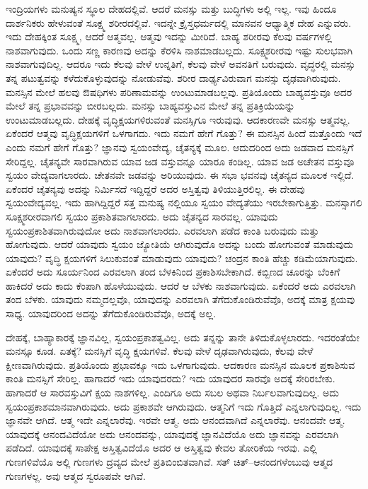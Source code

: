 ಇಂದ್ರಿಯಗಳು ಮನುಷ್ಯನ ಸ್ಥೂಲ ದೇಹದಲ್ಲಿವೆ. ಆದರೆ ಮನಸ್ಸು ಮತ್ತು ಬುದ್ಧಿಗಳು ಅಲ್ಲಿ ಇಲ್ಲ. ಇವು ಹಿಂದೂ ದಾರ್ಶನಿಕರು ಹೇಳುವಂತೆ ಸೂಕ್ಷ್ಮ ಶರೀರದಲ್ಲಿವೆ. ಇದನ್ನೇ ಕ್ರೈಸ್ತಧರ್ಮದಲ್ಲಿ ಮಾನವನ ಆಧ್ಯಾತ್ಮಿಕ ದೇಹ ಎನ್ನುವರು. ಇದು ದೇಹಕ್ಕಿಂತ ಸೂಕ್ಷ್ಮ, ಆದರೆ ಆತ್ಮವಲ್ಲ. ಆತ್ಮವು ಇದನ್ನು ಮೀರಿದೆ. ಬಾಹ್ಯ ಶರೀರವು ಕೆಲವು ವರ್ಷಗಳಲ್ಲಿ ನಾಶವಾಗುವುದು. ಒಂದು ಸಣ್ಣ ಕಾರಣವು ಅದನ್ನು ಕೆರಳಿಸಿ ನಾಶಮಾಡಬಲ್ಲದು. ಸೂಕ್ಷ್ಮಶರೀರವು ಇಷ್ಟು ಸುಲಭವಾಗಿ ನಾಶವಾಗುವುದಿಲ್ಲ. ಆದರೂ ಇದು ಕೆಲವು ವೇಳೆ ಉನ್ನತಿಗೆ, ಕೆಲವು ವೇಳೆ ಅವನತಿಗೆ ಬರುವುದು. ವೃದ್ಧರಲ್ಲಿ ಮನಸ್ಸು ತನ್ನ ಪಟುತ್ವವನ್ನು ಕಳೆದುಕೊಳ್ಳುವುದನ್ನು ನೋಡುವೆವು. ಶರೀರ ದಾರ್ಢ್ಯವಿರುವಾಗ ಮನಸ್ಸು ದೃಢವಾಗಿರುವುದು. ಮನಸ್ಸಿನ ಮೇಲೆ ಹಲವು ಔಷಧಿಗಳು ಪರಿಣಾಮವನ್ನು ಉಂಟುಮಾಡಬಲ್ಲವು. ಪ್ರತಿಯೊಂದು ಬಾಹ್ಯವಸ್ತುವೂ ಅದರ ಮೇಲೆ ತನ್ನ ಪ್ರಭಾವವನ್ನು ಬೀರಬಲ್ಲದು. ಮನಸ್ಸು ಬಾಹ್ಯವಸ್ತುವಿನ ಮೇಲೆ ತನ್ನ ಪ್ರತಿಕ್ರಿಯೆಯನ್ನು ಉಂಟುಮಾಡಬಲ್ಲದು. ದೇಹಕ್ಕೆ ವೃದ್ಧಿಕ್ಷಯಗಳಿರುವಂತೆ ಮನಸ್ಸಿಗೂ ಇರುವುವು. ಆದಕಾರಣವೇ ಮನಸ್ಸು ಆತ್ಮವಲ್ಲ. ಏಕೆಂದರೆ ಆತ್ಮವು ವೃದ್ಧಿಕ್ಷಯಗಳಿಗೆ ಒಳಗಾಗದು. ಇದು ನಮಗೆ ಹೇಗೆ ಗೊತ್ತು? ಈ ಮನಸ್ಸಿನ ಹಿಂದೆ ಮತ್ತೊಂದು ಇದೆ ಎಂದು ನಮಗೆ ಹೇಗೆ ಗೊತ್ತು? ಜ್ಞಾನವು ಸ್ವಯಂವೇದ್ಯ, ಚೈತನ್ಯಕ್ಕೆ ಮೂಲ. ಆದುದರಿಂದ ಅದು ಜಡವಾದ ಮನಸ್ಸಿಗೆ ಸೇರಿದ್ದಲ್ಲ. ಚೈತನ್ಯವೇ ಸಾರವಾಗಿರುವ ಯಾವ ಜಡ ವಸ್ತುವನ್ನೂ ಯಾರೂ ಕಂಡಿಲ್ಲ. ಯಾವ ಜಡ ಅಚೇತನ ವಸ್ತುವೂ ಸ್ವಯಂ ವೇದ್ಯವಾಗಲಾರದು. ಚೇತನವೇ ಜಡವನ್ನು ಅರಿಯುವುದು. ಈ ಸಭಾ ಭವನವು ಚೈತನ್ಯದ ಮೂಲಕ ಇಲ್ಲಿದೆ. ಏಕೆಂದರೆ ಚೈತನ್ಯವು ಅದನ್ನು ನಿರ್ಮಿಸದೆ ಇದ್ದಿದ್ದರೆ ಅದರ ಅಸ್ತಿತ್ವವು ತಿಳಿಯುತ್ತಿರಲಿಲ್ಲ. ಈ ದೇಹವು ಸ್ವಯಂವೇದ್ಯವಲ್ಲ. ಇದು ಹಾಗಿದ್ದಿದ್ದರೆ ಸತ್ತ ಮನುಷ್ಯ ನಲ್ಲಿಯೂ ಸ್ವಯಂ ವೇದ್ಯತೆಯು ಇರಬೇಕಾಗುತ್ತಿತ್ತು. ಮನಸ್ಸಾಗಲಿ ಸೂಕ್ಷ್ಮಶರೀರವಾಗಲಿ ಸ್ವಯಂ ಪ್ರಕಾಶಿತವಾಗಲಾರದು. ಅದು ಚೈತನ್ಯದ ಸಾರವಲ್ಲ. ಯಾವುದು ಸ್ವಯಂಪ್ರಕಾಶಿತವಾಗಿರುವುದೋ ಅದು ನಾಶವಾಗಲಾರದು. ಎರವಲಾಗಿ ಪಡೆದ ಕಾಂತಿ ಬರುವುದು ಮತ್ತು ಹೋಗುವುದು. ಆದರೆ ಯಾವುದು ಸ್ವಯಂ ಜ್ಯೋತಿಯೆ ಆಗಿರುವುದೊ ಅದನ್ನು ಬಂದು ಹೋಗುವಂತೆ ಮಾಡುವುದು ಯಾವುದು? ವೃದ್ಧಿ ಕ್ಷಯಗಳಿಗೆ ಸಿಲುಕುವಂತೆ ಮಾಡುವುದು ಯಾವುದು? ಚಂದ್ರನ ಕಾಂತಿ ಹೆಚ್ಚು ಕಡಿಮೆಯಾಗುವುದು. ಏಕೆಂದರೆ ಅದು ಸೂರ್ಯನಿಂದ ಎರವಲಾಗಿ ತಂದ ಬೆಳಕಿನಿಂದ ಪ್ರಕಾಶಿಸಬೇಕಾಗಿದೆ. ಕಬ್ಬಿಣದ ಚೂರನ್ನು ಬೆಂಕಿಗೆ ಹಾಕಿದರೆ ಅದು ಕಾದು ಕೆಂಪಾಗಿ ಹೊಳೆಯುವುದು. ಆದರೆ ಆ ಬೆಳಕು ನಾಶವಾಗುವುದು. ಏಕೆಂದರೆ ಅದು ಎರವಲಾಗಿ ತಂದ ಬೆಳಕು. ಯಾವುದು ನಮ್ಮದಲ್ಲವೊ, ಯಾವುದನ್ನು ಎರವಲಾಗಿ ತೆಗೆದುಕೊಂಡಿರುವೆವೊ, ಅದಕ್ಕೆ ಮಾತ್ರ ಕ್ಷಯವು ಸಾಧ್ಯ. ಯಾವುದರಿಂದ ಅದನ್ನು ತೆಗೆದುಕೊಂಡಿರುವೆವೊ, ಅದಕ್ಕೆ ಅಲ್ಲ.

ದೇಹಕ್ಕೆ, ಬಾಹ್ಯಾಕಾರಕ್ಕೆ ಜ್ಞಾನವಿಲ್ಲ, ಸ್ವಯಂಪ್ರಕಾಶತ್ವವಿಲ್ಲ. ಅದು ತನ್ನನ್ನು ತಾನೇ ತಿಳಿದುಕೊಳ್ಳಲಾರದು. ಇದರಂತೆಯೇ ಮನಸ್ಸೂ ಕೂಡ. ಏತಕ್ಕೆ? ಮನಸ್ಸಿಗೆ ವೃದ್ಧಿ ಕ್ಷಯಗಳಿವೆ. ಕೆಲವು ವೇಳೆ ದೃಢವಾಗಿರುವುದು, ಕೆಲವು ವೇಳೆ ಕ್ಷೀಣವಾಗಿರುವುದು. ಪ್ರತಿಯೊಂದು ಪ್ರಭಾವಕ್ಕೂ ಇದು ಒಳಗಾಗುವುದು. ಆದಕಾರಣ ಮನಸ್ಸಿನ ಮೂಲಕ ಪ್ರಕಾಶಿಸುವ ಕಾಂತಿ ಮನಸ್ಸಿಗೆ ಸೇರಿಲ್ಲ. ಹಾಗಾದರೆ ಇದು ಯಾವುದರದು? ಇದು ಯಾವುದರ ಸಾರವೊ ಅದಕ್ಕೆ ಸೇರಿರಬೇಕು. ಹಾಗಾದರೆ ಆ ಸಾರವಸ್ತುವಿಗೆ ಕ್ಷಯ ನಾಶಗಳಿಲ್ಲ. ಎಂದಿಗೂ ಅದು ಸಬಲ ಅಥವಾ ನಿರ್ಬಲವಾಗುವುದಿಲ್ಲ. ಅದು ಸ್ವಯಂಪ್ರಕಾಶಮಾನವಾಗಿರುವುದು. ಅದು ಪ್ರಕಾಶವೇ ಆಗಿರುವುದು. ಆತ್ಮನಿಗೆ ಇದು ಗೊತ್ತಿದೆ ಎನ್ನಲಾಗುವುದಿಲ್ಲ. ಇದು ಜ್ಞಾನವೇ ಆಗಿದೆ. ಆತ್ಮ ಇದೇ ಎನ್ನಲಾರೆವು. ಇರವೇ ಆತ್ಮ. ಅದು ಆನಂದವಾಗಿದೆ ಎನ್ನಲಾರೆವು. ಆನಂದವೇ ಆತ್ಮ. ಯಾವುದಕ್ಕೆ ಆನಂದವಿದೆಯೋ ಅದು ಆನಂದವನ್ನು, ಯಾವುದಕ್ಕೆ ಜ್ಞಾನವಿದೆಯೊ ಅದು ಜ್ಞಾನವನ್ನು ಎರವಲಾಗಿ ಪಡೆದಿದೆ. ಯಾವುದಕ್ಕೆ ಸಾಪೇಕ್ಷ ಅಸ್ತಿತ್ವವಿದೆಯೊ ಅದರ ಆ ಅಸ್ತಿತ್ವವು ಕೇವಲ ತೋರಿಕೆಯ ಇರವು. ಎಲ್ಲಿ ಗುಣಗಳಿವೆಯೊ ಅಲ್ಲಿ ಗುಣಗಳು ದ್ರವ್ಯದ ಮೇಲೆ ಪ್ರತಿಬಿಂಬಿತವಾಗಿವೆ. ಸತ್​ ಚಿತ್​–ಆನಂದಗಳೆಂಬುವು ಆತ್ಮದ ಗುಣಗಳಲ್ಲ. ಅವು ಆತ್ಮದ ಸ್ವರೂಪವೇ ಆಗಿವೆ.

